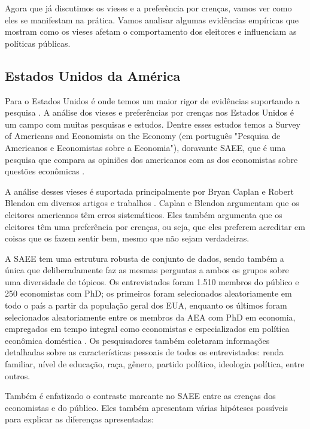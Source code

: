Agora que já discutimos os vieses e a preferência por crenças, vamos ver como eles se manifestam na prática. Vamos analisar algumas evidências empíricas que mostram como os vieses afetam o comportamento dos eleitores e influenciam as políticas públicas.

\subsection{Estados Unidos da América}

Para o Estados Unidos é onde temos um maior rigor de evidências suportando a pesquisa \cite{The_Myth_of_the_Rational_Voter,Systematically_Biased_Beliefs_about_Economics,blendon-gap}. A análise dos vieses e preferências por crenças nos Estados Unidos é um campo com muitas pesquisas e estudos. Dentre esses estudos temos a Survey of Americans and Economists on the Economy (em português "Pesquisa de Americanos e Economistas sobre a Economia"), doravante SAEE, que é uma pesquisa que compara as opiniões dos americanos com as dos economistas sobre questões econômicas \cite{saee1996}.  

A análise desses vieses é suportada principalmente por Bryan Caplan e Robert Blendon em diversos artigos e trabalhos \cite{The_Myth_of_the_Rational_Voter,Systematically_Biased_Beliefs_about_Economics,think_like_economists,blendon-gap}. Caplan e Blendon argumentam que os eleitores americanos têm erros sistemáticos. Eles também argumenta que os eleitores têm uma preferência por crenças, ou seja, que eles preferem acreditar em coisas que os fazem sentir bem, mesmo que não sejam verdadeiras.

A SAEE tem uma estrutura robusta de conjunto de dados, sendo também a única que deliberadamente faz as mesmas perguntas a ambos os grupos sobre uma diversidade de tópicos. Os entrevistados foram 1.510 membros do público e 250 economistas com PhD; os primeiros foram selecionados aleatoriamente em todo o país a partir da população geral dos EUA, enquanto os últimos foram selecionados aleatoriamente entre os membros da AEA com PhD em economia, empregados em tempo integral como economistas e especializados em política econômica doméstica \cite{saee1996,Systematically_Biased_Beliefs_about_Economics,blendon-gap}. Os pesquisadores também coletaram informações detalhadas sobre as características pessoais de todos os entrevistados: renda familiar, nível de educação, raça, gênero, partido político, ideologia política, entre outros. 

Também é enfatizado o contraste marcante no SAEE entre as crenças dos economistas e do público. Eles também apresentam várias hipóteses possíveis para explicar as diferenças apresentadas:

